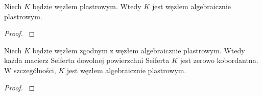 \begin{corollary}
    Niech $K$ będzie węzłem plastrowym.
    Wtedy $K$ jest węzłem algebraicznie plastrowym.
\end{corollary}

\begin{proof}
    \cite[s. 158]{kawauchi96}
\end{proof}

\begin{proposition}
    \label{prp:cobordant_to_algebraic_is_algebraic}
    Niech $K$ będzie węzłem zgodnym z węzłem algebraicznie plastrowym.
    Wtedy każda macierz Seiferta dowolnej powierzchni Seiferta $K$ jest zerowo kobordantna.
    W szczególności, $K$ jest węzłem algebraicznie plastrowym.
\end{proposition}

\begin{proof}
    \cite[s. 159]{kawauchi96}
\end{proof}

